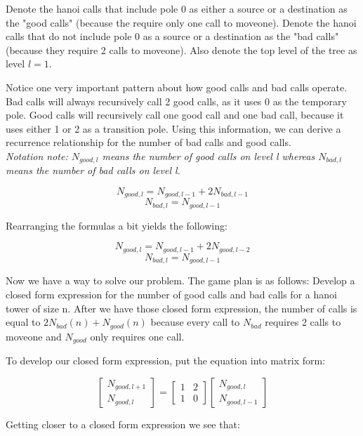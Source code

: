 \documentclass[11pt, letterpaper]{article}
\begin{document}
\begin{enumerate}[label=(\alph*)]
\pagebreak

\quad Denote the hanoi calls that include pole 0 as either a source or a destination as the "good calls" (because the require only one call to moveone). Denote the hanoi calls that do not include pole 0 as a source or a destination as the "bad calls" (because they require 2 calls to moveone). Also denote the top level of the tree as level $l = 1$. 

\quad Notice one very important pattern about how good calls and bad calls operate. Bad calls will always recursively call 2 good calls, as it uses 0 as the temporary pole. Good calls will recursively call one good call and one bad call, because it uses either 1 or 2 as a transition pole. Using this information, we can derive a recurrence relationship for the number of bad calls and good calls. \\
\textit{Notation note: $N_{good,l}$ means the number of good calls on level l whereas $N_{bad, l}$ means the number of bad calls on level l.}

$$ N_{good, l} = N_{good, l-1} + 2N_{bad, l-1} $$
$$ N_{bad, l} = N_{good, l-1} $$

\quad Rearranging the formulas a bit yields the following:

$$ N_{good, l} = N_{good, l-1} + 2N_{good, l-2} $$
$$ N_{bad, l} = N_{good, l-1} $$

\quad Now we have a way to solve our problem. The game plan is as follows: Develop a closed form expression for the number of good calls and bad calls for a hanoi tower of size n. After we have those closed form expression, the number of calls is equal to $2N_{bad}(n) + N_{good}(n)$ because every call to $N_{bad}$ requires 2 calls to moveone and $N_{good}$ only requires one call.

To develop our closed form expression, put the equation into matrix form:

\[
\begin{bmatrix}
N_{good, l+1} \\
N_{good, l}
\end{bmatrix}
=
\begin{bmatrix}
1 & 2 \\
1 & 0
\end{bmatrix}
\begin{bmatrix}
N_{good, l} \\
N_{good, l - 1}
\end{bmatrix}
\]

Getting closer to a closed form expression we see that:


\end{enumerate}
\end{document}
